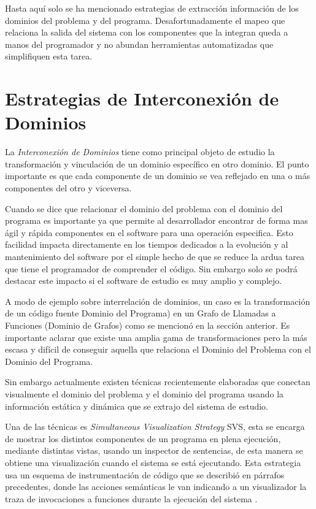 \documentclass[12pt]{report}
\begin{document}
Hasta aquí solo se ha mencionado estrategias de extracción información de los dominios del problema y del programa. Desafortunadamente el mapeo que relaciona la salida del sistema con los componentes que la integran queda a manos del programador y no abundan herramientas automatizadas que simplifiquen esta tarea.

\section{Estrategias de Interconexión de \\Dominios}

La \textit{Interconexión de Dominios} \cite{BRM10} tiene como principal objeto de estudio la transformación y vinculación de un dominio específico en otro dominio.
El punto importante es que cada componente de un dominio se vea reflejado en una o más componentes del otro y viceversa. 

Cuando se dice que relacionar el dominio del problema con el dominio del programa es importante ya que permite al desarrollador encontrar de forma mas ágil y rápida componentes en el software para una operación especifica. Esto facilidad impacta directamente en los tiempos dedicados a la evolución y al mantenimiento del software por el simple hecho de que se reduce la ardua tarea que tiene el programador de comprender el código.
Sin embargo solo se podrá destacar este impacto si el software de estudio es muy amplio y complejo.

A modo de ejemplo sobre interrelación de dominios, un caso es la transformación de un código fuente Dominio del Programa) en un Grafo de Llamadas a Funciones (Dominio de Grafos) como se mencionó en la sección anterior. Es importante aclarar que existe una amplia gama de transformaciones pero la más escasa y difícil de conseguir aquella que relaciona el Dominio del Problema con el Dominio del Programa.

Sin embargo actualmente existen técnicas recientemente elaboradas que conectan visualmente el dominio del problema y el dominio del programa usando la información estática y dinámica que se extrajo del sistema de estudio.

Una de las técnicas es \textit{Simultaneous Visualization Strategy} SVS, esta se encarga de mostrar los distintos componentes de un programa en plena ejecución, mediante distintas vistas, usando un inspector de sentencias, de esta manera se obtiene una visualización cuando el sistema se está ejecutando. Esta estrategia usa un esquema de instrumentación de código que se describió en párrafos precedentes, donde las acciones semánticas le van indicando a un visualizador la traza de invocaciones a funciones durante la ejecución del sistema \cite{BRM10,MPMR07}.
\end{document}
